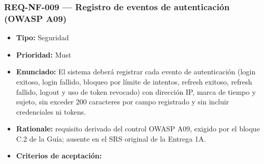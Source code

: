\documentclass[
  spanish,
]{article}
\providecommand{\tightlist}{%
  \setlength{\itemsep}{0pt}\setlength{\parskip}{0pt}}
\begin{document}
\subsubsection{REQ-NF-009 --- Registro de eventos de autenticación
(OWASP
A09)}\label{req-nf-009-registro-de-eventos-de-autenticaciuxf3n-owasp-a09}

\begin{itemize}
\tightlist
\item
  \textbf{Tipo:} Seguridad
\item
  \textbf{Prioridad:} Must
\item
  \textbf{Enunciado:} El sistema deberá registrar cada evento de
  autenticación (login exitoso, login fallido, bloqueo por límite de
  intentos, refresh exitoso, refresh fallido, logout y uso de token
  revocado) con dirección IP, marca de tiempo y sujeto, sin exceder 200
  caracteres por campo registrado y sin incluir credenciales ni tokens.
\item
  \textbf{Rationale:} requisito derivado del control OWASP A09, exigido
  por el bloque C.2 de la Guía; ausente en el SRS original de la Entrega
  1A.
\item
  \textbf{Criterios de aceptación:}


\end{itemize}
\end{document}
